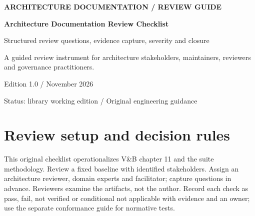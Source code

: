 \documentclass[11pt,letterpaper]{article}
\newcommand{\docsection}[1]{\Needspace{5\baselineskip}\section{#1}}
\begin{document}
\begin{titlepage}\thispagestyle{empty}\raggedright
\vspace*{0.65in}
{\sffamily\bfseries\color{teal} ARCHITECTURE DOCUMENTATION / REVIEW GUIDE\par}
\vspace{0.35in}
{\sffamily\bfseries\color{navy}\Huge Architecture Documentation Review Checklist\par}
\vspace{0.2in}
{\sffamily\Large\color{muted} Structured review questions, evidence capture, severity and closure\par}
\vspace{0.35in}\noindent{\color{teal}\rule{\linewidth}{1.5pt}}\par
\vspace{0.3in}
A guided review instrument for architecture stakeholders, maintainers, reviewers and governance practitioners.

\vfill
{\sffamily\small Edition 1.0 \quad /  November 2026\par
Status: library working edition \quad / \quad Original engineering guidance\par}
\end{titlepage}
\tableofcontents\clearpage
\docsection{Review setup and decision rules}
This original checklist operationalizes V\&B chapter 11 and the suite methodology. Review a fixed baseline with identified stakeholders. Assign an architecture reviewer, domain experts and facilitator; capture questions in advance. Reviewers examine the artifacts, not the author. Record each check as pass, fail, not verified or conditional not applicable with evidence and an owner; use the separate conformance guide for normative tests.
\end{document}
